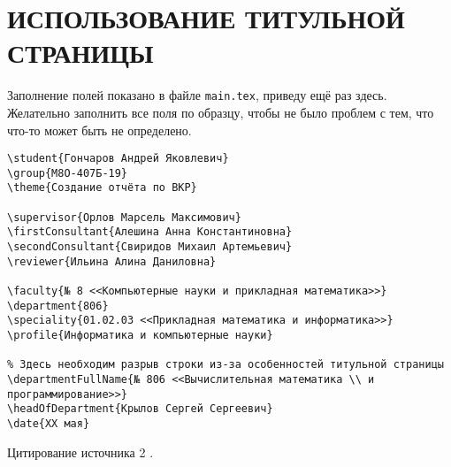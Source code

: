 \section{ИСПОЛЬЗОВАНИЕ ТИТУЛЬНОЙ СТРАНИЦЫ}

Заполнение полей показано в файле \texttt{main.tex}, приведу ещё раз здесь. 
Желательно заполнить все поля по образцу, чтобы не было проблем с тем, 
что что-то может быть не определено.

\begingroup
\fontsize{10pt}{12pt}\selectfont
\begin{verbatim}
\student{Гончаров Андрей Яковлевич}
\group{М8О-407Б-19}
\theme{Создание отчёта по ВКР}

\supervisor{Орлов Марсель Максимович}
\firstConsultant{Алешина Анна Константиновна}
\secondConsultant{Свиридов Михаил Артемьевич}
\reviewer{Ильина Алина Даниловна}

\faculty{№ 8 <<Компьютерные науки и прикладная математика>>}
\department{806}
\speciality{01.02.03 <<Прикладная математика и информатика>>}
\profile{Информатика и компьютерные науки}

% Здесь необходим разрыв строки из-за особенностей титульной страницы
\departmentFullName{№ 806 <<Вычислительная математика \\ и программирование>>}
\headOfDepartment{Крылов Сергей Сергеевич}
\date{XX мая}
\end{verbatim}
\endgroup

\lipsum[3]

Цитирование источника 2 \cite{Wikipedia2}.